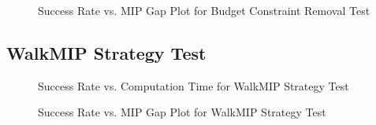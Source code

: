 \begin{figure}[H]
    \centering
    \begin{minipage}{0.6\columnwidth}
        \centering
        \resizebox{\linewidth}{!}{}
    \end{minipage}%
    \hfill
    \begin{minipage}{0.4\columnwidth}
        \centering
        \resizebox{\linewidth}{!}{}
    \end{minipage}
    \caption{Success Rate vs. MIP Gap Plot for Budget Constraint Removal Test}
    \label{fig:PACS_BDGRem_MGAP}
\end{figure}

\subsection{WalkMIP Strategy Test}\label{sec:test_walkMIP}
\begin{figure}[H]
    \centering
    \begin{minipage}{0.6\columnwidth}
        \centering
        \resizebox{\linewidth}{!}{}
    \end{minipage}%
    \hfill
    \begin{minipage}{0.4\columnwidth} 
        \centering
        \resizebox{\linewidth}{!}{}
    \end{minipage}
    \caption{Success Rate vs. Computation Time for WalkMIP Strategy Test}
    \label{fig:PACS_WalkMIP_SuccRate}
\end{figure}


\begin{figure}[H]
    \centering
    \begin{minipage}{0.6\columnwidth}
        \centering
        \resizebox{\linewidth}{!}{}
    \end{minipage}%
    \hfill
    \begin{minipage}{0.4\columnwidth}
        \centering
        \resizebox{\linewidth}{!}{}
    \end{minipage}
    \caption{Success Rate vs. MIP Gap Plot for WalkMIP Strategy Test}
    \label{fig:PACS_WalkMIP_MGAP}
\end{figure}



